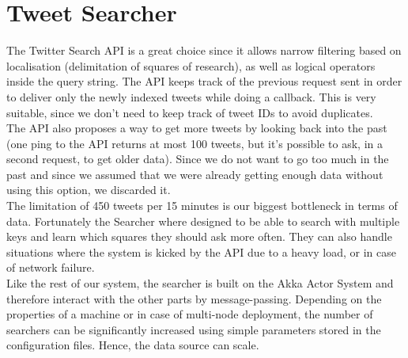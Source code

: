 \section{Tweet Searcher}

The Twitter Search API is a great choice since it allows narrow filtering based on localisation (delimitation of squares of research), as well as logical operators inside the query string. The API keeps track of the previous request sent in order to deliver only the newly indexed tweets while doing a callback. This is very suitable, since we don't need to keep track of tweet IDs to avoid duplicates. \\

The API also proposes a way to get more tweets by looking back into the past (one ping to the API returns at most 100 tweets, but it's possible to ask, in a second request, to get older data). Since we do not want to go too much in the past and since we assumed that we were already getting enough data without using this option, we discarded it. \\

The limitation of 450 tweets per 15 minutes is our biggest bottleneck in terms of data. Fortunately the Searcher where designed to be able to search with multiple keys and learn which squares they should ask more often. They can also handle situations where the system is kicked by the API due to a heavy load, or in case of network failure. \\

Like the rest of our system, the searcher is built on the Akka Actor System and therefore interact with the other parts by message-passing. Depending on the properties of a machine or in case of multi-node deployment, the number of searchers can be significantly increased using simple parameters stored in the configuration files. Hence, the data source can scale. \\